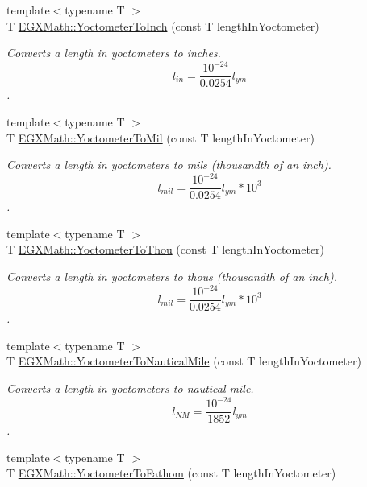 \begin{DoxyCompactItemize}
{\footnotesize template$<$typename T $>$ }\\T \mbox{\hyperlink{group___e_g_x_math-_conversions-_length_conversions-_s_i-_yoctometer-_imperial_gaaaba7544cf3189cd374782786a13646c}{E\+G\+X\+Math\+::\+Yoctometer\+To\+Inch}} (const T length\+In\+Yoctometer)
\begin{DoxyCompactList}\small\item\em Converts a length in yoctometers to inches. \[ l_{in}= \frac{10^{-24}}{0.0254} l_{ym} \]. \end{DoxyCompactList}\item 
{\footnotesize template$<$typename T $>$ }\\T \mbox{\hyperlink{group___e_g_x_math-_conversions-_length_conversions-_s_i-_yoctometer-_imperial_gacb2a1154ec79cfd130de96e92dfeedfa}{E\+G\+X\+Math\+::\+Yoctometer\+To\+Mil}} (const T length\+In\+Yoctometer)
\begin{DoxyCompactList}\small\item\em Converts a length in yoctometers to mils (thousandth of an inch). \[ l_{mil}= \frac{10^{-24}}{0.0254} l_{ym} * 10^{3} \]. \end{DoxyCompactList}\item 
{\footnotesize template$<$typename T $>$ }\\T \mbox{\hyperlink{group___e_g_x_math-_conversions-_length_conversions-_s_i-_yoctometer-_imperial_ga9c2fbce1711afe0740edd868815ffea1}{E\+G\+X\+Math\+::\+Yoctometer\+To\+Thou}} (const T length\+In\+Yoctometer)
\begin{DoxyCompactList}\small\item\em Converts a length in yoctometers to thous (thousandth of an inch). \[ l_{mil}= \frac{10^{-24}}{0.0254} l_{ym} * 10^{3} \]. \end{DoxyCompactList}\item 
{\footnotesize template$<$typename T $>$ }\\T \mbox{\hyperlink{group___e_g_x_math-_conversions-_length_conversions-_s_i-_yoctometer-_nautical_gae49dab08f77667adbef6d419339a54c0}{E\+G\+X\+Math\+::\+Yoctometer\+To\+Nautical\+Mile}} (const T length\+In\+Yoctometer)
\begin{DoxyCompactList}\small\item\em Converts a length in yoctometers to nautical mile. \[ l_{NM}= \frac{10^{-24}}{1852} l_{ym} \]. \end{DoxyCompactList}\item 
{\footnotesize template$<$typename T $>$ }\\T \mbox{\hyperlink{group___e_g_x_math-_conversions-_length_conversions-_s_i-_yoctometer-_nautical_gae0ed365ad4fa316377b2054b86012240}{E\+G\+X\+Math\+::\+Yoctometer\+To\+Fathom}} (const T length\+In\+Yoctometer)

\end{DoxyCompactItemize}
